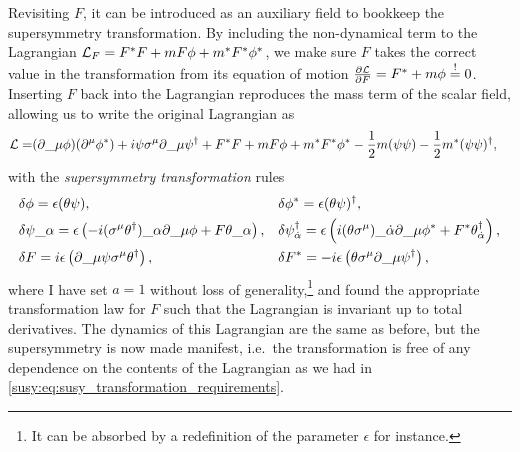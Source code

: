 \documentclass[../main.tex]{subfiles}
\begin{document}
Revisiting \(F\), it can be introduced as an auxiliary field to bookkeep the
supersymmetry transformation. By including the non-dynamical term to the
Lagrangian \(\L_F = F^\ast F + m F \phi + m^\ast F^\ast \phi^\ast\), we make
sure \(F\) takes the correct value in the transformation from its equation of
motion \(\pd[F]{\L} = F^\ast + m \phi \mbeq 0\). Inserting \(F\) back into the
Lagrangian reproduces the mass term of the scalar field, allowing us to write
the original Lagrangian as
\begin{align}
  \L = & (\partial\_{\mu} \phi)(\partial\^{\mu}\phi^\ast) + i \psi \sigma\^{\mu} \partial\_{\mu} \psi^\dagger + F^\ast F + m F \phi + m^\ast F^\ast \phi^\ast - \frac{1}{2}m (\psi\psi) - \frac{1}{2}m^\ast (\psi\psi)^\dagger,
\end{align}
with the \emph{supersymmetry transformation} rules
\begin{subequations}
  \begin{align}
     & \delta\phi       = \epsilon (\theta \psi),                                                                                                                                       &
     & \delta\phi^\ast = \epsilon (\theta\psi)^\dagger,                                                                                                                                   \\
     & \delta\psi\_{\alpha} = \epsilon \pclosed{-i(\sigma\^{\mu} \theta^\dagger)\_{\alpha} \partial\_{\mu} \phi  + F \theta\_{\alpha}},                                                 &
     & \delta\psi\indices*{^\dagger_{\dot\alpha}} = \epsilon \pclosed{i(\theta \sigma\^{\mu})\_{\dot\alpha} \partial\_{\mu} \phi^\ast + F^\ast \theta\indices*{^\dagger_{\dot\alpha}}},   \\
     & \delta F         = i \epsilon \pclosed{\partial\_{\mu} \psi \sigma\^{\mu} \theta^\dagger},                                                                                       &
     & \delta F^\ast = -i \epsilon \pclosed{\theta \sigma\^{\mu} \partial\_{\mu} \psi^\dagger},
  \end{align}
\end{subequations}
where I have set \(a=1\) without loss of generality,\footnote{It can be absorbed by a redefinition of the parameter \(\epsilon\) for instance.} and found the appropriate transformation law for \(F\) such that the Lagrangian is invariant up to total derivatives.
The dynamics of this Lagrangian are the same as before, but the supersymmetry is now made manifest, i.e.~the transformation is free of any dependence on the contents of the Lagrangian as we had in \cref{susy:eq:susy_transformation_requirements}.
\end{document}
